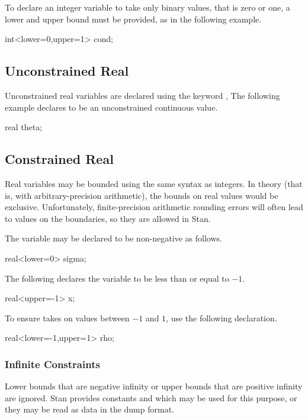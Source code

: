 To declare an integer variable  to take only binary values,
that is zero or one, a lower and upper bound must be provided, as in
the following example.
%
\begin{stancode}
int<lower=0,upper=1> cond;
\end{stancode}


\subsection{Unconstrained Real}

Unconstrained real variables are declared using the keyword
, The following example declares  to be an
unconstrained continuous value.
%
\begin{stancode}
real theta;
\end{stancode}
%

\subsection{Constrained Real}

Real variables may be bounded using the same syntax as integers.  In
theory (that is, with arbitrary-precision arithmetic), the bounds on
real values would be exclusive.  Unfortunately, finite-precision
arithmetic rounding errors will often lead to values on the
boundaries, so they are allowed in Stan.

The variable  may be declared to be non-negative as follows.
%
\begin{stancode}
real<lower=0> sigma;
\end{stancode}
%
The following declares the variable  to be less than or equal
to $-1$.
%
\begin{stancode}
real<upper=-1> x;
\end{stancode}
%
To ensure  takes on values between $-1$ and $1$, use the
following declaration.
%
\begin{stancode}
real<lower=-1,upper=1> rho;
\end{stancode}
%

\subsubsection{Infinite Constraints}

Lower bounds that are negative infinity or upper bounds that are
positive infinity are ignored.  Stan provides constants
 and  which may
be used for this purpose, or they may be read as data in the dump
format.


